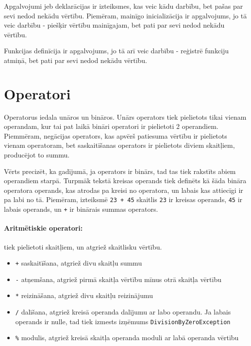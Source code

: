 \documentclass[12pt,a4paper]{report}
\begin{document}
Apgalvojumi jeb deklarācijas ir izteiksmes, kas veic kādu darbību, bet pašas par sevi nedod nekādu vērtību. Piemēram, mainīgo inicializācija ir apgalvojums, jo tā veic darbību - piešķir vērtību mainīgajam, bet pati par sevi nedod nekādu vērtību.

Funkcijas definīcija ir apgalvojums, jo tā arī veic darbību - reģistrē funkciju atmiņā, bet pati par sevi nedod nekādu vērtību.

\section{Operatori}
\label{section:operators}

Operatorus iedala unāros un bināros. Unārs operators tiek pielietots tikai vienam operandam, kur tai pat laikā bināri operatori ir pielietoti 2 operandiem. Piemmēram, negācijas operators, kas apvērš patiesuma vērtību ir pielietots vienam operatoram, bet saskaitīšanas operators ir pielietots diviem skaitļiem, producējot to summu.

Vērts precizēt, ka gadījumā, ja operators ir binārs, tad tas tiek rakstīts abiem operandiem starpā. Turpmāk tekstā kreisas operands tiek definēts kā šāda bināra operatora operands, kas atrodas pa kreisi no operatora, un labais kas attiecīgi ir pa labi no tā. Piemēram, izteiksmē \texttt{23 + 45} skaitlis \texttt{23} ir kreisas operands, \texttt{45} ir labais operands, un \texttt{+} ir binārais summas operators. \\

\paragraph{Aritmētiskie operatori:} tiek pielietoti skaitļiem, un atgriež skaitlisku vērtību.

\begin{itemize}
  \item \texttt{+} saskaitīšana, atgriež divu skaitļu summu
  \item \texttt{-} atņemšana, atgriež pirmā skaitļa vērtību mīnus otrā skaitļa vērtību
  \item \texttt{*} reizināšana, atgriež divu skaitļu reizinājumu
  \item \texttt{/} dalīšana, atgriež kreisā operanda dalījumu ar labo operandu. Ja labais operands ir nulle, tad tiek izmests izņēmums \texttt{DivisionByZeroException}
  \item \texttt{\%} modulis, atgriež kreisā skaitļa operanda moduli ar labā operanda vērtību
\end{itemize}
\end{document}
